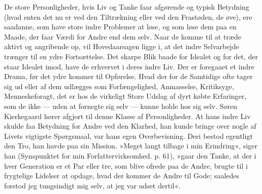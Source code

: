 \documentclass[12pt,a4paper,openany]{book}
\begin{document}
De store Personligheder, hvis Liv og Tanke faar
afgørende og typisk Betydning (hvad enten det nu er
ved den Tiltrækning eller ved den Frastøden, de øve),
ere saadanne, som have store indre Problemer at løse,
og som løse dem paa en Maade, der faar Værdi for
Andre end dem selv. Naar de komme til at træde aktivt
og angribende op, vil Hovedaarsagen ligge i, at det
indre Selvarbejde trænger til en ydre Fortsættelse. Det
skarpe Blik baade for Idealet og for det, der staar
Idealet imod, have de erhvervet i deres indre Liv. Der
er foregaaet et indre Drama, før det ydre kommer til
Opførelse. Hvad der for de Samtidige ofte tager sig ud
eller af dem udlægges som Forfængelighed, Anmasselse,
Kritiksyge, Menneskeforagt, det er hos de virkeligt Store
Udslag af dyrt købte Erfaringer, som de ikke --- uden
at fornegte sig selv --- kunne holde hos sig selv. Søren
Kierkegaard hører afgjort til denne Klasse af Personligheder.
At hans indre Liv skulde faa Betydning for
Andre ved den Klarhed, han kunde bringe over nogle
af Livets vigtigste Spørgsmaal, var hans egen Overbevisning.
Deri bestod egentligt den Tro, han havde paa sin
Mission. »Meget langt tilbage i min Erindring«, siger
han (Synspunktet for min Forfattervirksomhed. p. 61),
»gaar den Tanke, at der i hver Generation er et Par
eller tre, som blive ofrede paa de Andre, brugte til i
frygtelige Lidelser at opdage, hvad der kommer de Andre
til Gode; saaledes forstod jeg tungsindigt mig selv, at
jeg var udset dertil«.
\end{document}
